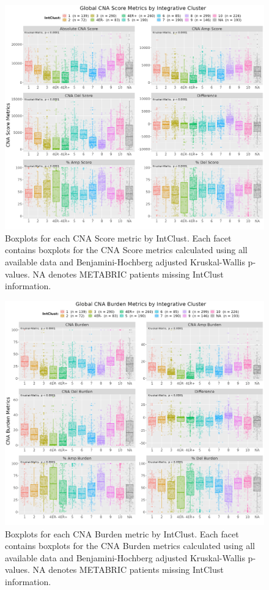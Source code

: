 \begin{figure}[!ht]
\center
\includegraphics[width=1\textwidth]{../figures/Chapter_2/Global_CNA_Score_Metrics_Across_IntClust.png}
\caption[Boxplots for each CNA Score metric by IntClust.]{Boxplots for each CNA Score metric by IntClust. Each facet contains boxplots for the CNA Score metrics calculated using all available data and Benjamini-Hochberg adjusted Kruskal-Wallis p-values. NA denotes METABRIC patients missing IntClust information.}
\label{fig:CNA-Score-Metric-Boxplots-IC}
\end{figure}

\begin{figure}[!ht]
\center
\includegraphics[width=1\textwidth]{../figures/Chapter_2/Global_CNA_Burden_Metrics_Across_IntClust.png}
\caption[Boxplots for each CNA Burden metric by IntClust.]{Boxplots for each CNA Burden metric by IntClust. Each facet contains boxplots for the CNA Burden metrics calculated using all available data and Benjamini-Hochberg adjusted Kruskal-Wallis p-values. NA denotes METABRIC patients missing IntClust information.}
\label{fig:CNA-Burden-Metric-Boxplots-IC}
\end{figure}

